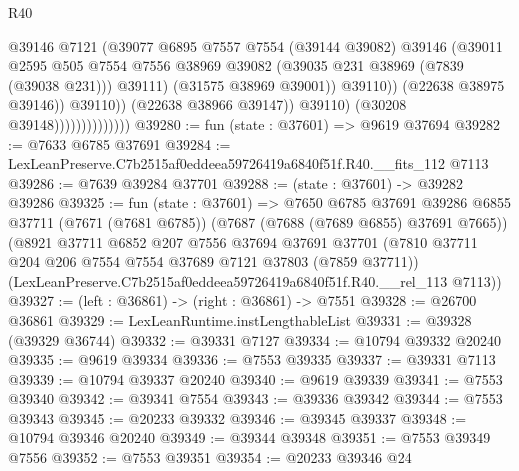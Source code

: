 \begin{lexlean}{R40}
\begin{coremodule}
                                            @39146
                                            @7121
                                            (@39077
                                              @6895
                                              @7557
                                              @7554
                                              (@39144 @39082)
                                              @39146
                                              (@39011
                                                @2595
                                                @505
                                                @7554
                                                @7556
                                                @38969
                                                @39082
                                                (@39035 @231 @38969 (@7839 (@39038 @231)))
                                                @39111)
                                              (@31575 @38969 @39001))
                                            @39110))
                                        (@22638 @38975 @39146))
                                      @39110))
                                  (@22638 @38966 @39147))
                                @39110)
                              (@30208 @39148))))))))))))))
@39280 := fun (state : @37601) => @9619 @37694
@39282 := @7633 @6785 @37691
@39284 := LexLeanPreserve.C7b2515af0eddeea59726419a6840f51f.R40.__fits_112 @7113
@39286 := @7639 @39284 @37701
@39288 := (state : @37601) -> @39282 @39286
@39325 := fun (state : @37601) =>
  @7650
    @6785
    @37691
    @39286
    @6855
    @37711
    (@7671 (@7681 @6785))
    (@7687 (@7688 (@7689 @6855) @37691 @7665))
    (@8921
      @37711
      @6852
      @207
      @7556
      @37694
      @37691
      @37701
      (@7810 @37711 @204 @206 @7554 @7554 @37689 @7121 @37803 (@7859 @37711))
      (LexLeanPreserve.C7b2515af0eddeea59726419a6840f51f.R40.__rel_113 @7113))
@39327 := (left : @36861) -> (right : @36861) -> @7551
@39328 := @26700 @36861
@39329 := LexLeanRuntime.instLengthableList
@39331 := @39328 (@39329 @36744)
@39332 := @39331 @7127
@39334 := @10794 @39332 @20240
@39335 := @9619 @39334
@39336 := @7553 @39335
@39337 := @39331 @7113
@39339 := @10794 @39337 @20240
@39340 := @9619 @39339
@39341 := @7553 @39340
@39342 := @39341 @7554
@39343 := @39336 @39342
@39344 := @7553 @39343
@39345 := @20233 @39332
@39346 := @39345 @39337
@39348 := @10794 @39346 @20240
@39349 := @39344 @39348
@39351 := @7553 @39349 @7556
@39352 := @7553 @39351
@39354 := @20233 @39346 @24

\end{coremodule}
\end{lexlean}
